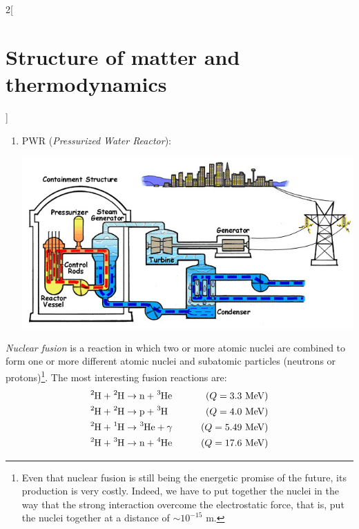 \documentclass[../../../main.tex]{subfiles}
\begin{document}
\begin{multicols}{2}[\section{Structure of matter and thermodynamics}]
\begin{definition}
\begin{enumerate}
\begin{center}
\begin{minipage}{\linewidth}
              \end{minipage}
            \end{center}
      \item PWR (\textit{Pressurized Water Reactor}):
            \begin{center}
              \begin{minipage}{\linewidth}
                \centering
                \includegraphics[width=\linewidth]{Images/pwr.jpg}
              \end{minipage}
            \end{center}
    \end{enumerate}
  \end{definition}
  \begin{definition}
    \textit{Nuclear fusion} is a reaction in which two or more atomic nuclei are combined to form one or more different atomic nuclei and subatomic particles (neutrons or protons)\footnote{Even that nuclear fusion is still being the energetic promise of the future, its production is very costly. Indeed, we have to put together the nuclei in the way that the strong interaction overcome the electrostatic force, that is, put the nuclei together at a distance of $\sim 10^{-15}\text{ m}$.}. The most interesting fusion reactions are:
    \begin{align*}
      \ce{^2H}+\ce{^2H} & \rightarrow\text{n}+\ce{^3He}\qquad & (Q=3.3\text{ MeV})  \\
      \ce{^2H}+\ce{^2H} & \rightarrow\text{p}+\ce{^3H}\qquad  & (Q=4.0\text{ MeV})  \\
      \ce{^2H}+\ce{^1H} & \rightarrow\ce{^3He}+\gamma\qquad   & (Q=5.49\text{ MeV}) \\
      \ce{^2H}+\ce{^3H} & \rightarrow\text{n}+\ce{^4He}\qquad & (Q=17.6\text{ MeV})
    \end{align*}
  \end{definition}

\end{multicols}
\end{document}
